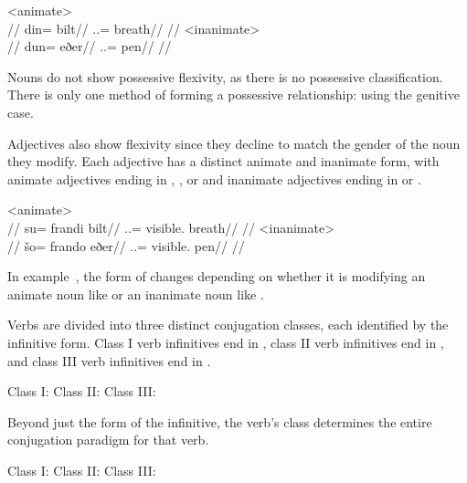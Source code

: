 	\a<animate>\begingl
		\glpreamble{}\\
		//
		\gla din= bilt//
		\glb \An.\Pl.\Erg= breath//
		\glft{}//
	\endgl
	\a<inanimate>\begingl
		\glpreamble{}\\
		//
		\gla dun= eðer//
		\glb \In.\Pl.\Erg= pen//
		\glft{}//
	\endgl
\xe

Nouns do not show possessive flexivity, as there is no possessive classification\autocite{wals-59}. There is only one method of forming a possessive relationship: using the genitive case.

Adjectives also show flexivity since they decline to match the gender of the noun they modify. Each adjective has a distinct animate and inanimate form, with animate adjectives ending in , , or  and inanimate adjectives ending in  or .

	\a<animate>\begingl
		\glpreamble{}\\
		//
		\gla su= frandi bilt//
		\glb \An.\Sg.\Gen= visible.\An{} breath//
		\glft{}//
	\endgl
	\a<inanimate>\begingl
		\glpreamble{}\\
		//
		\gla šo= frando eðer//
		\glb \In.\Sg.\Gen= visible.\In{} pen//
		\glft{}//
	\endgl
\xe

In example~, the form of  changes depending on whether it is modifying an animate noun like  or an inanimate noun like .

Verbs are divided into three distinct conjugation classes, each identified by the infinitive form. Class I verb infinitives end in , class II verb infinitives end in , and class III verb infinitives end in .

	Class I:    
	\a<cl2>Class II:    
	\a<cl3>Class III:    
\xe

Beyond just the form of the infinitive, the verb's class determines the entire conjugation paradigm for that verb.

	Class I:    
	\a<cl2>Class II:    
	\a<cl3>Class III:    
\xe

